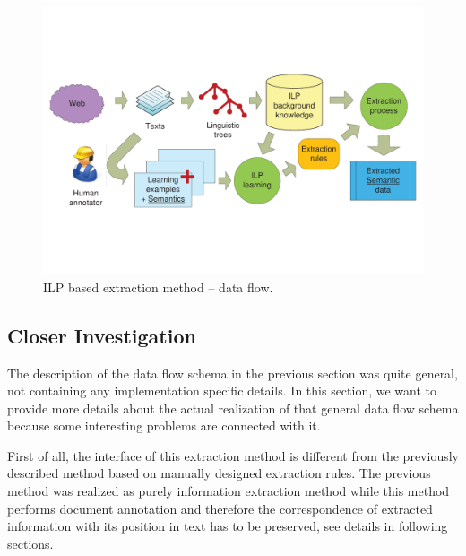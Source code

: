 \begin{figure}
	\centering
		\includegraphics[angle=-90, width=0.85\hsize]{ILP_data_flow}
	\caption{ILP based extraction method -- data flow.}
	\label{fig:ILP_data_flow}
\end{figure}


\subsection{Closer Investigation}
The description of the data flow schema in the previous section was quite general, not containing any implementation specific details. In this section, we want to provide more details about the actual realization of that general data flow schema because some interesting problems are connected with it.

First of all, the interface of this extraction method is different from the previously described method based on manually designed extraction rules. The previous method was realized as purely information extraction method while this method performs document annotation and therefore the correspondence of extracted information with its position in text has to be preserved, see details in following sections. 

